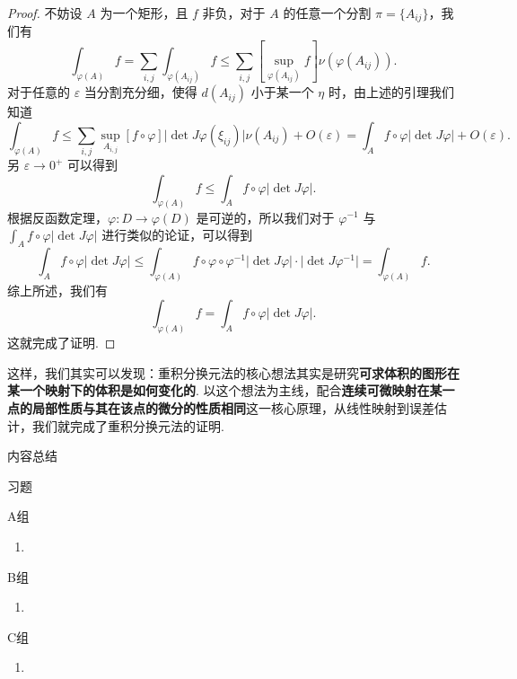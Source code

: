 \begin{proof}
    不妨设 $A$ 为一个矩形，且 $f$ 非负，对于 $A$ 的任意一个分割 $\pi = \{A_{ij}\}$，我们有\[\int_{\varphi(A)}f = \sum_{i, j}\int_{\varphi(A_{ij})}f \leqslant \sum_{i, j}[\sup\limits_{\varphi(A_{ij})}f]\nu(\varphi(A_{ij})).\]
    对于任意的 $\varepsilon$ 当分割充分细，使得 $d(A_{ij})$ 小于某一个 $\eta$ 时，由上述的引理我们知道\[\int_{\varphi(A)}f \leqslant \sum_{i, j}\sup\limits_{A_{i, j}}[f\circ\varphi] \lvert\det J\varphi(\xi_{ij})\rvert \nu(A_{ij}) + O(\varepsilon) = \int_{A}f\circ\varphi\lvert\det J\varphi\rvert + O(\varepsilon).\]
    另 $\varepsilon\to0^+$ 可以得到\[\int_{\varphi(A)}f\leqslant \int_A f\circ\varphi\lvert\det J\varphi\rvert.\]
    根据反函数定理，$\varphi\colon D\to \varphi(D)$ 是可逆的，所以我们对于 $\varphi^{-1}$ 与 $\displaystyle\int_{A}f\circ\varphi\lvert\det J\varphi\rvert$ 进行类似的论证，可以得到 \[\int_{A}f \circ \varphi\lvert \det J\varphi\rvert \leqslant \int_{\varphi(A)}f\circ \varphi\circ\varphi^{-1}\lvert\det J\varphi\rvert \cdot\lvert \det J\varphi^{-1}\rvert  = \int_{\varphi(A)}f.\]
    综上所述，我们有\[\int_{\varphi(A)}f = \int_{A}f\circ\varphi\lvert\det J\varphi\rvert.\]这就完成了证明.
\end{proof}

这样，我们其实可以发现：重积分换元法的核心想法其实是研究\textbf{可求体积的图形在某一个映射下的体积是如何变化的}. 以这个想法为主线，配合\textbf{连续可微映射在某一点的局部性质与其在该点的微分的性质相同}这一核心原理，从线性映射到误差估计，我们就完成了重积分换元法的证明.

\vspace{2ex}
\centerline{\heiti \Large 内容总结}

\vspace{2ex}
\centerline{\heiti \Large 习题}

\vspace{2ex}
{\kaishu }
\begin{flushright}
    \kaishu

\end{flushright}

\centerline{\heiti A组}
\begin{enumerate}
    \item
\end{enumerate}

\centerline{\heiti B组}
\begin{enumerate}
    \item
\end{enumerate}

\centerline{\heiti C组}
\begin{enumerate}
    \item
\end{enumerate}
